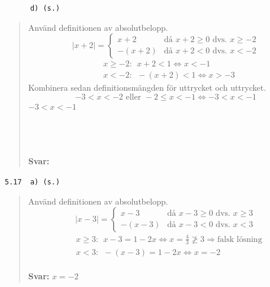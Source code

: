 \documentclass[a4paper]{article}
\newcommand{\tskcol}[1]{\textcolor{tskcol}{#1}}
\begin{document}
	\texttt{\tskcol{~~~~~~d) (s.)}}
	\begin{quotation}
		\noindent
		Använd definitionen av absolutbelopp.
		\[|x+2|=
		\begin{cases}
		x+2&    \text{då } x+2 \ge 0 \text{ dvs. } x \ge -2\\
		-(x+2)& \text{då } x+2 < 0   \text{ dvs. } x < -2
		\end{cases}\]
		\begin{align*}
		& x \ge -2:~~ x+2 < 1 \Leftrightarrow x < -1\\
		& x < -2:~~ -(x+2) < 1 \Leftrightarrow x > -3
		\end{align*}
		Kombinera sedan definitionsmängden för uttrycket och uttrycket.
		\[-3 < x < -2 \text{ eller } -2 \le x < -1 \Leftrightarrow -3 < x < -1\]
		$-3 < x < -1$ \\ \\
		\\ \\
		\textbf{Svar:}
	\end{quotation}
	
	\texttt{\tskcol{5.17~~a) (s.)}}
	\begin{quotation}
		\noindent
		Använd definitionen av absolutbelopp.
		\[|x-3|=
		\begin{cases}
		x-3&    \text{då } x-3 \ge 0 \text{ dvs. } x \ge 3\\
		-(x-3)& \text{då } x-3 < 0   \text{ dvs. } x < 3
		\end{cases}\]
		\begin{align*}
		& x \ge 3:~~ x-3 = 1-2x \Leftrightarrow x = \frac{4}{3} \not\ge 3 \Rightarrow\text{falsk lösning}\\
		& x < 3:~~ -(x-3) = 1-2x \Leftrightarrow x = -2
		\end{align*}
		\\ 
		\textbf{Svar:} $x=-2$
	\end{quotation}
	
\end{document}
